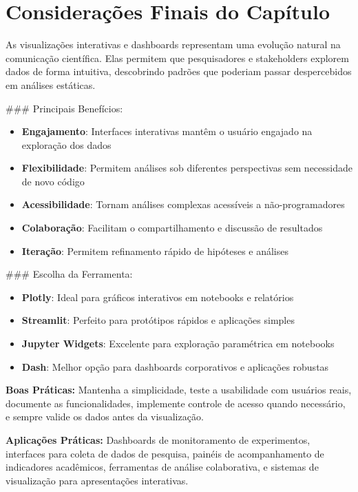 \section{Considerações Finais do Capítulo}

As visualizações interativas e dashboards representam uma evolução natural na comunicação científica. Elas permitem que pesquisadores e stakeholders explorem dados de forma intuitiva, descobrindo padrões que poderiam passar despercebidos em análises estáticas.

### Principais Benefícios:

\begin{itemize}
\item \textbf{Engajamento}: Interfaces interativas mantêm o usuário engajado na exploração dos dados
\item \textbf{Flexibilidade}: Permitem análises sob diferentes perspectivas sem necessidade de novo código
\item \textbf{Acessibilidade}: Tornam análises complexas acessíveis a não-programadores
\item \textbf{Colaboração}: Facilitam o compartilhamento e discussão de resultados
\item \textbf{Iteração}: Permitem refinamento rápido de hipóteses e análises
\end{itemize}

### Escolha da Ferramenta:

\begin{itemize}
\item \textbf{Plotly}: Ideal para gráficos interativos em notebooks e relatórios
\item \textbf{Streamlit}: Perfeito para protótipos rápidos e aplicações simples
\item \textbf{Jupyter Widgets}: Excelente para exploração paramétrica em notebooks
\item \textbf{Dash}: Melhor opção para dashboards corporativos e aplicações robustas
\end{itemize}

\begin{warningbox}
\textbf{Boas Práticas:} Mantenha a simplicidade, teste a usabilidade com usuários reais, documente as funcionalidades, implemente controle de acesso quando necessário, e sempre valide os dados antes da visualização.
\end{warningbox}

\begin{researchbox}
\textbf{Aplicações Práticas:} Dashboards de monitoramento de experimentos, interfaces para coleta de dados de pesquisa, painéis de acompanhamento de indicadores acadêmicos, ferramentas de análise colaborativa, e sistemas de visualização para apresentações interativas.
\end{researchbox}